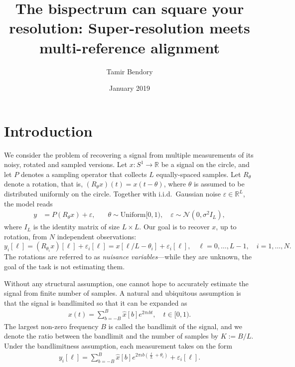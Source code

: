 \documentclass[english,12pt]{article}
\newcommand{\I}{\iota}
\newcommand{\R}{\mathbb{R}}
\newcommand{\tB}{B}
\numberwithin{equation}{section}
\numberwithin{thm}{section} %
\begin{document}
\title{The bispectrum can square your resolution: Super-resolution meets multi-reference alignment}

\author{Tamir Bendory}
\date{January 2019}
\maketitle


\section{Introduction}

We consider the problem of recovering a signal from multiple measurements of its noisy, rotated and sampled versions. Let $x: S^1\rightarrow\R$ be a signal on the circle, and let $P$ denotes a sampling operator that collects $L$ equally-spaced samples.
Let $R_\theta$ denote a  rotation, that is, $(R_\theta x)(t)= x(t-\theta)$, where  $\theta$ is assumed to be distributed uniformly on the circle. Together with i.i.d.\ Gaussian noise $\varepsilon\in \R^L$,  the model reads
\begin{align} \label{eq:model}
y &= P(R_\theta x) + \varepsilon, \quad & \theta\sim \text{Uniform}[0,1),\quad \varepsilon\sim \mathcal{N}(0,\sigma^2 I_L),
\end{align}
where $I_L$ is the identity matrix of size $L\times L$. 
Our goal is to recover $x$, up to rotation, from $N$ independent observations:
\begin{equation} \label{eq:continuous_measurements}
y_i[\ell] = \left(R_{\theta_i} x\right)[\ell] + \varepsilon_i[\ell] =  x[\ell/L-\theta_i] + \varepsilon_i[\ell], \quad \ell=0,\ldots,L-1, \quad i=1,\ldots,N.
\end{equation}
The rotations are referred to as \emph{nuisance variables}---while they are unknown, the goal of the task is not estimating them.

Without any structural assumption, one cannot hope to accurately estimate the signal from finite number of samples. 
A natural and ubiquitous assumption is that the signal is bandlimited so that it can  be expanded as 
\begin{eqnarray} \label{eq:fourier_expansion}
x(t) = \sum_{b=-\tB}^{\tB}\hat{x}[b]e^{2\pi\I bt }, \quad t\in[0,1).
\end{eqnarray}
The largest non-zero frequency $\tB$ is called the bandlimit of the signal, and we denote the ratio between the bandlimit and the number of samples by $K:=B/L$. Under the bandlimitness assumption, each measurement takes on the form
\begin{eqnarray} \label{eq:fourier_expansion}
y_i[\ell] = \sum_{b=-\tB}^{\tB}\hat{x}[b]e^{2\pi\I b\left(\frac{\ell}{L}+\theta_i\right) }+ \varepsilon_i[\ell].
\end{eqnarray}
\end{document}
